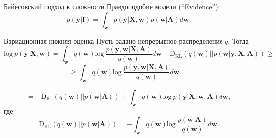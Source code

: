 \documentclass[10pt,pdf,utf8,russian,aspectratio=169]{beamer}
\begin{document}
\begin{frame}{Байесовский подход к сложности}
Правдоподобие модели (``Evidence''):
\[
	p(\mathbf{y}|\mathbf{f}) = \int_\mathbf{w} p(\mathbf{y}|\mathbf{X},\mathbf{w})p(\mathbf{w}|\mathbf{A}) d\mathbf{w}.
\]


\begin{figure}
  \centering
\label{fig:1}\qquad

\end{figure}


\end{frame}


\begin{frame}{Вариационная нижняя оценка}
Пусть задано непрерывное распределение $q$. 
Тогда 
$$
\text{log}~p(\mathbf{y}|\mathbf{X},\mathbf{w})  = \int_{\mathbf{w}} q(\mathbf{w})\text{log}~\frac{p(\mathbf{y},\mathbf{w}|\mathbf{X},\mathbf{A})}{q(\mathbf{w})}d\mathbf{w} + \text{D}_\text{KL}  (q(\mathbf{w})||p(\mathbf{w}| \mathbf{y}, \mathbf{X}, \mathbf{A})) \geq	
$$
$$
\geq \int_{\mathbf{w}} q(\mathbf{w})\text{log}~\frac{p(\mathbf{y},  \mathbf{w}|\mathbf{X}, \mathbf{A})}{q(\mathbf{w})}d\mathbf{w} =
$$

$$
= -\text{D}_\text{KL} (q(\mathbf{w})||p(\mathbf{w}|\mathbf{A})) + \int_{\mathbf{w}} q(\mathbf{w})\text{log}~{p(\mathbf{y}|\mathbf{X}, \mathbf{w},\mathbf{A})} d \mathbf{w},
$$
где $$\text{D}_\text{KL}(q(\mathbf{w})||p(\mathbf{w} |\mathbf{A})) = -\int_{\mathbf{w}} q(\mathbf{w})\text{log}~\frac{p(\mathbf{w} | \mathbf{A})}{q(\mathbf{w})}d\mathbf{w}.$$

\end{frame}
\end{document}
